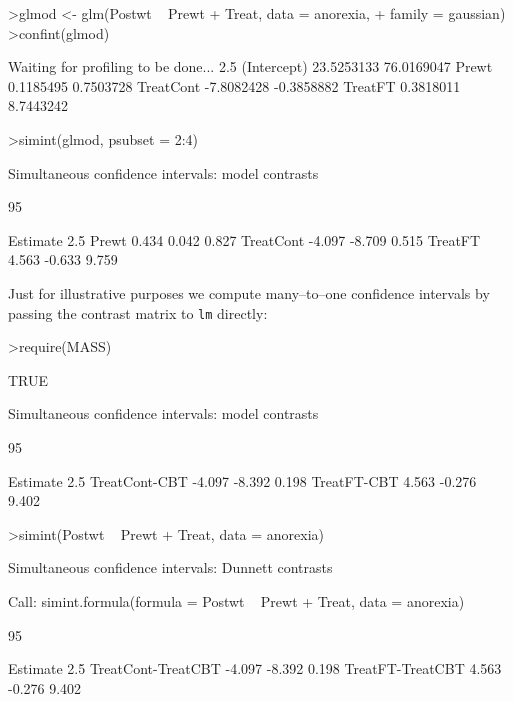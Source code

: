 \documentclass{article}
\begin{document}
\begin{Schunk}
\begin{Sinput}
>glmod <- glm(Postwt ~ Prewt + Treat, data = anorexia, 
+     family = gaussian)
>confint(glmod)
\end{Sinput}
\begin{Soutput}
Waiting for profiling to be done...
                 2.5 %     97.5 %
(Intercept) 23.5253133 76.0169047
Prewt        0.1185495  0.7503728
TreatCont   -7.8082428 -0.3858882
TreatFT      0.3818011  8.7443242
\end{Soutput}
\begin{Sinput}
>simint(glmod, psubset = 2:4)
\end{Sinput}
\begin{Soutput}
	Simultaneous confidence intervals: model contrasts

	95 % confidence intervals

          Estimate  2.5 % 97.5 %
Prewt        0.434  0.042  0.827
TreatCont   -4.097 -8.709  0.515
TreatFT      4.563 -0.633  9.759
\end{Soutput}
\end{Schunk}
\normalsize

Just for illustrative purposes we compute many--to--one confidence intervals
by passing the contrast matrix to \texttt{lm} directly:
\small
\begin{Schunk}
\begin{Sinput}
>require(MASS)
\end{Sinput}
\begin{Soutput}
[1] TRUE
\end{Soutput}
\begin{Soutput}
	Simultaneous confidence intervals: model contrasts

	95 % confidence intervals

              Estimate  2.5 % 97.5 %
TreatCont-CBT   -4.097 -8.392  0.198
TreatFT-CBT      4.563 -0.276  9.402
\end{Soutput}
\begin{Sinput}
>simint(Postwt ~ Prewt + Treat, data = anorexia)
\end{Sinput}
\begin{Soutput}
	Simultaneous confidence intervals: Dunnett
	contrasts

Call: 
simint.formula(formula = Postwt ~ Prewt + Treat, data = anorexia)

	95 % confidence intervals

                   Estimate  2.5 % 97.5 %
TreatCont-TreatCBT   -4.097 -8.392  0.198
TreatFT-TreatCBT      4.563 -0.276  9.402
\end{Soutput}
\end{Schunk}
\normalsize
\end{document}
